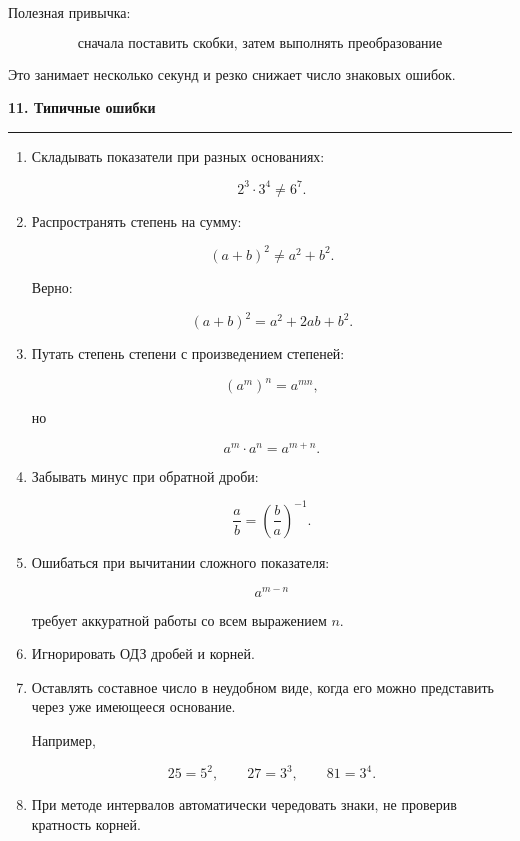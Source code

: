 \documentclass[a4paper,12pt]{article}
\newcommand{\MainSection}[1]{%
  \vspace{0.7em}
  {\Large\bfseries\color{darkaccent}#1\par}
  \vspace{0.25em}
  {\color{accent}\rule{\linewidth}{0.6pt}}
  \vspace{0.5em}
}
\begin{document}
Полезная привычка:

\[
\boxed{
\text{сначала поставить скобки,
затем выполнять преобразование}
}
\]

Это занимает несколько секунд и резко снижает число знаковых ошибок.


\MainSection{11. Типичные ошибки}

\begin{enumerate}

\item
Складывать показатели при разных основаниях:

\[
2^3\cdot3^4
\ne
6^7.
\]

\item
Распространять степень на сумму:

\[
(a+b)^2
\ne
a^2+b^2.
\]

Верно:

\[
(a+b)^2=a^2+2ab+b^2.
\]

\item
Путать степень степени с произведением степеней:

\[
(a^m)^n=a^{mn},
\]

но

\[
a^m\cdot a^n=a^{m+n}.
\]

\item
Забывать минус при обратной дроби:

\[
\frac ab
=
\left(\frac ba\right)^{-1}.
\]

\item
Ошибаться при вычитании сложного показателя:

\[
a^{m-n}
\]

требует аккуратной работы со всем выражением \(n\).

\item
Игнорировать ОДЗ дробей и корней.

\item
Оставлять составное число в неудобном виде, когда его можно
представить через уже имеющееся основание.

Например,

\[
25=5^2,
\qquad
27=3^3,
\qquad
81=3^4.
\]

\item
При методе интервалов автоматически чередовать знаки,
не проверив кратность корней.

\end{enumerate}
\end{document}
